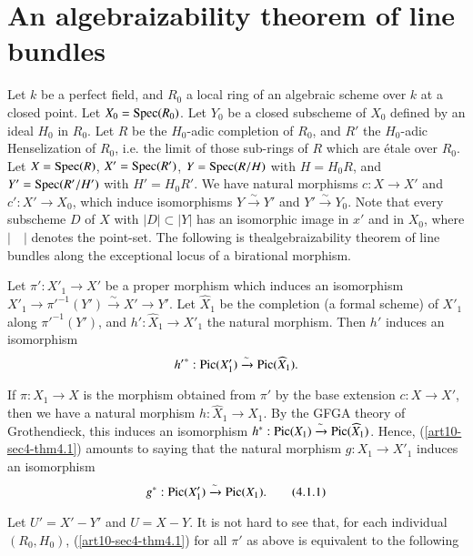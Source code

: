 \section{An algebraizability theorem of line bundles}\label{art10-sec4}

Let $k$ be a perfect field, and $R_{0}$ a local ring of an algebraic scheme over $k$ at a closed point. Let $X_{0}=\operatorname{\mathrm{Spec}} (R_{0})$. Let $Y_{0}$ be a closed subscheme of $X_{0}$ defined by an ideal $H_{0}$ in $R_{0}$. Let $R$ be the $H_{0}$-adic completion of $R_{0}$, and $R'$ the $H_{0}$-adic Henselization of $R_{0}$, i.e. the limit of those sub-rings of $R$ which are \'etale over $R_{0}$. Let $X=\operatorname{\mathrm{Spec}} (R)$, $X'=\operatorname{\mathrm{Spec}} (R')$, $Y=\operatorname{\mathrm{Spec}} (R/H)$ with $H=H_{0}R$, and $Y'=\operatorname{\mathrm{Spec}} (R'/H')$ with $H'=H_{0}R'$. We have natural morphisms $c:X\to X'$ and $c':X'\to X_{0}$, which induce isomorphisms $Y\xrightarrow{\sim}Y'$ and $Y'\xrightarrow{\sim}Y_{0}$. Note that every subscheme $D$ of $X$ with $|D|\subset |Y|$ has an isomorphic image in $x'$ and in $X_{0}$, where $|\quad|$ denotes the point-set. The following is the\pageoriginale algebraizability theorem of line bundles along the exceptional locus of a birational morphism.

\begin{theorem}\label{art10-sec4-thm4.1}
Let $\pi':X'_{1}\to X'$ be a proper morphism which induces an isomorphism $X'_{1}\to {\pi'}^{-1}(Y')\xrightarrow{\sim}X'\to Y'$. Let $\widehat{X}_{1}$ be the completion (a formal scheme) of $X'_{1}$ along ${\pi'}^{-1}(Y')$, and $h':\widehat{X}_{1}\to X'_{1}$ the natural morphism. Then $h'$ induces an isomorphism
$$
{h'}^{*}:\operatorname{\mathrm{Pic}} (X'_{1})\xrightarrow{\sim}\operatorname{\mathrm{Pic}}(\widehat{X}_{1}).
$$
\end{theorem}

If $\pi:X_{1}\to X$ is the morphism obtained from $\pi'$ by the base extension $c:X\to X'$, then we have a natural morphism $h:\widehat{X}_{1}\to X_{1}$. By the GFGA theory of Grothendieck, this induces an isomorphism $h^{*}:\operatorname{\mathrm{Pic}}(X_{1})\xrightarrow{\sim}\operatorname{\mathrm{Pic}}(\widehat{X}_{1})$. Hence, (\ref{art10-sec4-thm4.1}) amounts to saying that the natural morphism $g:X_{1}\to X'_{1}$ induces an isomorphism
\begin{equation*}
g^{*}:\operatorname{\mathrm{Pic}}(X'_{1})\xrightarrow{\sim}\operatorname{\mathrm{Pic}}(X_{1}).\tag{4.1.1}\label{art10-sec4-eq4.1.1}
\end{equation*}

Let $U'=X'-Y'$ and $U=X-Y$. It is not hard to see that, for each individual $(R_{0},H_{0})$, (\ref{art10-sec4-thm4.1}) for all $\pi'$ as above is equivalent to the following

